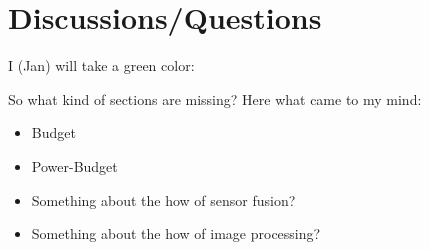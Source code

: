\documentclass[fontsize=11pt,paper=a4,]{scrartcl}
\begin{document}
\section{Discussions/Questions}

I (Jan) will take {\color{green} a green color}:

{\color{green} So what kind of sections are missing? Here what came to my mind:
\begin{itemize}
 \item Budget
 \item Power-Budget
 \item Something about the how of sensor fusion?
 \item Something about the how of image processing?
\end{itemize}
}


\newpage
\printbibliography
{}
\pagestyle{plain}
\end{document}
